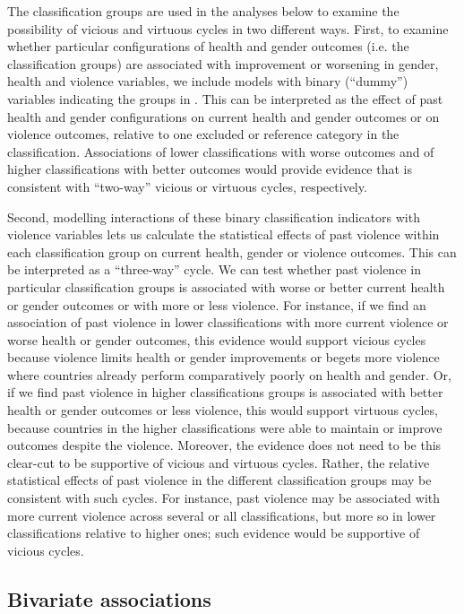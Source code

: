 \documentclass[12pt]{article}
\begin{document}
The classification groups are used in the analyses below to examine the possibility of vicious and virtuous cycles in two different ways.
First, to examine whether particular configurations of health and gender outcomes (i.e. the classification groups) are associated with improvement or worsening in gender, health and violence variables, we include models with binary (\enquote{dummy}) variables indicating the groups in . This can be interpreted as the effect of past health and gender configurations on current health and gender outcomes or on violence outcomes, relative to one excluded or reference category in the classification.
Associations of lower classifications with worse outcomes and of higher classifications with better outcomes would provide evidence that is consistent with \enquote{two-way} vicious or virtuous cycles, respectively.

Second, modelling interactions of these binary classification indicators with violence variables lets us calculate the statistical effects of past violence within each classification group on current health, gender or violence outcomes. This can be interpreted as a \enquote{three-way} cycle. We can test whether past violence in particular classification groups is associated with worse or better current health or gender outcomes or with more or less violence. For instance, if we find an association of past violence in lower classifications with more current violence or worse health or gender outcomes, this evidence would support vicious cycles because violence limits health or gender improvements or begets more violence where countries already perform comparatively poorly on health and gender. Or, if we find past violence in higher classifications groups is associated with better health or gender outcomes or less violence, this would support virtuous cycles, because countries in the higher classifications were able to maintain or improve outcomes despite the violence. Moreover, the evidence does not need to be this clear-cut to be supportive of vicious and virtuous cycles. Rather, the relative statistical effects of past violence in the different classification groups may be consistent with such cycles.
For instance, past violence may be associated with more current violence across several or all classifications, but more so in lower classifications relative to higher ones; such evidence would be supportive of vicious cycles.

\subsection{Bivariate associations}
\end{document}
